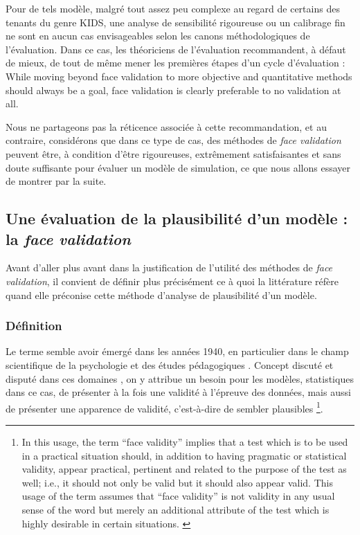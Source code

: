 Pour de tels modèle, malgré tout assez peu complexe au regard de certains des tenants du genre KIDS, une analyse de sensibilité rigoureuse ou un calibrage fin ne sont en aucun cas envisageables selon les canons méthodologiques de l'évaluation.
Dans ce cas, les théoriciens de l'évaluation recommandent, à défaut de mieux, de tout de même mener les premières étapes d'un cycle d'évaluation \autocite[342]{petty2010verification} :
	\og While moving beyond face validation to more objective and quantitative methods should always be a goal, face validation is clearly preferable to no validation at all.\fg{}

Nous ne partageons pas la réticence associée à cette recommandation, et au contraire, considérons que dans ce type de cas, des méthodes de \og \textit{face validation}\fg{} peuvent être, à condition d'être rigoureuses, extrêmement satisfaisantes et sans doute suffisante pour évaluer un modèle de simulation, ce que nous allons essayer de montrer par la suite.

\subsection{Une évaluation de la plausibilité d'un modèle : la \og \textit{face validation}\fg{}}\label{subsec:face-validity}

Avant d'aller plus avant dans la justification de l'utilité des méthodes de \textit{face validation}, il convient de définir plus précisément ce à quoi la littérature réfère quand elle préconise cette méthode d'analyse de plausibilité d'un modèle.

\subsubsection{Définition}
Le terme semble avoir émergé dans les années 1940, en particulier dans le champ scientifique de la psychologie et des études pédagogiques \autocite{nevo_face_1985}.
Concept discuté et disputé dans ces domaines \autocite{mosier_critical_1947}, on y attribue un besoin pour les modèles, statistiques dans ce cas, de présenter à la fois une validité à l'épreuve des données, mais aussi de présenter une apparence de validité, c'est-à-dire de sembler plausibles
\footnote{
	\og
	In this usage, the term ``face validity'' implies that a test which is to be used in a practical situation should, in addition to having pragmatic or statistical validity, appear practical, pertinent and related to the purpose of the test as well; i.e., it should not only be valid but it should also appear valid.
	This usage of the term assumes that ``face validity'' is not validity in any usual sense of the word but merely an additional attribute of the test which is highly desirable in certain situations.
	\fg{} \textcite[192]{mosier_critical_1947}
}.

